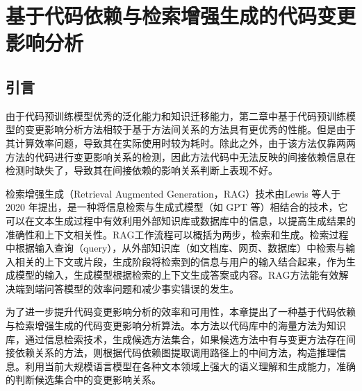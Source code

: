 \chapter{基于代码依赖与检索增强生成的代码变更影响分析}

\section{引言}


由于代码预训练模型优秀的泛化能力和知识迁移能力，第二章中基于代码预训练模型的变更影响分析方法相较于基于方法间关系的方法具有更优秀的性能。但是由于其计算效率问题，导致其在实际使用时较为耗时。除此之外，由于该方法仅靠两两方法的代码进行变更影响关系的检测，因此方法代码中无法反映的间接依赖信息在检测时缺失了，导致其在间接依赖的影响关系判断上表现不好。

检索增强生成（Retrieval Augmented Generation，RAG）技术由Lewis 等人\cite{2020Retrieval}于 2020 年提出，是一种将信息检索与生成式模型（如 GPT 等）相结合的技术，它可以在文本生成过程中有效利用外部知识库或数据库中的信息，以提高生成结果的准确性和上下文相关性。RAG工作流程可以概括为两步，检索和生成。检索过程中根据输入查询（query），从外部知识库（如文档库、网页、数据库）中检索与输入相关的上下文或片段，生成阶段将检索到的信息与用户的输入结合起来，作为生成模型的输入，生成模型根据检索的上下文生成答案或内容。RAG方法能有效解决端到端问答模型的效率问题和减少事实错误的发生。

为了进一步提升代码变更影响分析的效率和可用性，本章提出了一种基于代码依赖与检索增强生成的代码变更影响分析算法。本方法以代码库中的海量方法为知识库，通过信息检索技术，生成候选方法集合，如果候选方法中有与变更方法存在间接依赖关系的方法，则根据代码依赖图提取调用路径上的中间方法，构造推理信息。利用当前大规模语言模型在各种文本领域上强大的语义理解和生成能力，准确的判断候选集合中的变更影响关系。


